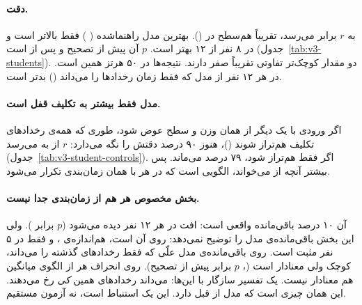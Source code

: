 \paragraph{دقت.}  به $r$ برابر  می‌رسد، تقریباً هم‌سطح  در  (). بهترین مدل راهنماشده ( ) فقط  بالاتر است و در ۸ نفر از ۱۲ بهتر است. $p$ آن پیش از تصحیح  و پس از   است (جدول~\ref{tab:v3-students}). دو مقدار کوچک‌تر  تفاوتی تقریباً صفر دارند. نتیجه‌ها در ۵۰ هرتز همین است.  در هر ۱۲ نفر از مدل  که فقط زمان رخدادها را می‌داند () بدتر است.

\begin{table}[H]
\centering
\caption{مدل‌های فقط‌ روی سری‌های آزمون در ۵۰۰ هرتز، میانگین ۱۲ نفر (هر نفر میانگین سه ). سه سطر پایین برای مقایسه از فصل‌های قبل آمده‌اند.}
\label{tab:v3-students}
\resizebox{\textwidth}{!}{}
\end{table}

\paragraph{ مدل فقط‌ بیشتر به تکلیف قفل است.} اگر  ورودی با  یک  دیگر از همان وزن و سطح عوض شود، طوری که همه‌ی رخدادهای تکلیف هم‌تراز شوند ()،  هنوز ۹۰ درصد دقتش را نگه می‌دارد: $r$ از  به  می‌رسد (جدول~\ref{tab:v3-student-controls}). اگر فقط  هم‌تراز شود، ۷۹ درصد می‌ماند. پس بیشتر آنچه  از  می‌خواند، الگویی است که در هر  با همان زمان‌بندی تکرار می‌شود.

\paragraph{بخش مخصوص هر  هم از زمان‌بندی جدا نیست.} آن ۱۰ درصد باقی‌مانده واقعی است: افت در هر ۱۲ نفر دیده می‌شود ($p$ برابر ). ولی این بخش باقی‌مانده‌ی مدل  را توضیح نمی‌دهد:  روی آن  است، هم‌اندازه‌ی ، و فقط در ۵ نفر مثبت است. روی باقی‌مانده‌ی مدل علّی  که فقط رخدادهای گذشته را می‌داند،  کوچک ولی معنادار است (، $p$ برابر  پیش از تصحیح). روی انحراف هر  از الگوی میانگین هم  معنادار نیست. یک تفسیر سازگار با این‌ها:  می‌داند رخدادهای همین  \emph{کی} رخ می‌دهند. این همان چیزی است که مدل  از قبل دارد. این یک استنباط است، نه آزمون مستقیم.

